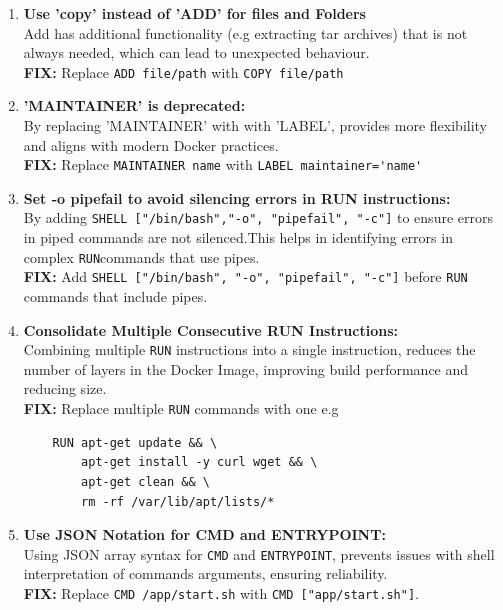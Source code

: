 \begin{enumerate}
    \item \textbf{Use 'copy' instead of 'ADD' for files and Folders}
    \\Add has additional functionality (e.g extracting tar archives) that is not always needed, which can lead to unexpected behaviour.
    \\\textbf{FIX:}  Replace \verb|ADD file/path|  with \verb|COPY file/path|
    
    \item \textbf{'MAINTAINER' is deprecated:}
   \\By replacing 'MAINTAINER' with with 'LABEL', provides more flexibility and aligns with modern Docker practices.
    \\\textbf{FIX:} Replace \verb|MAINTAINER name| with \verb|LABEL maintainer='name'|
    
    \item \textbf{Set -o pipefail to avoid silencing errors in RUN instructions:}
    \\By adding \verb|SHELL ["/bin/bash","-o", "pipefail", "-c"]| to ensure errors in piped commands are not silenced.This helps in identifying errors in complex \verb|RUN|commands that use pipes.
    \\\textbf{FIX:} Add \verb|SHELL ["/bin/bash", "-o", "pipefail", "-c"]| before \verb|RUN| commands that include pipes.
    
    \item \textbf{Consolidate Multiple Consecutive RUN Instructions:}
    \\ Combining multiple \verb|RUN| instructions into a single instruction, reduces the number of layers in the Docker Image, improving build performance and reducing size.
    \\\textbf{FIX:} Replace multiple \verb|RUN| commands with one e.g 
    \begin{lstlisting}
    RUN apt-get update && \
        apt-get install -y curl wget && \
        apt-get clean && \
        rm -rf /var/lib/apt/lists/*
    \end{lstlisting}
    
    \item \textbf{Use JSON Notation for CMD and ENTRYPOINT:}
    \\Using JSON array syntax for \verb|CMD| and \verb|ENTRYPOINT|, prevents issues with shell interpretation of commands arguments, ensuring reliability. 
    \\\textbf{FIX:} Replace \verb|CMD /app/start.sh| with \verb|CMD ["app/start.sh"]|.
    
\end{enumerate}

